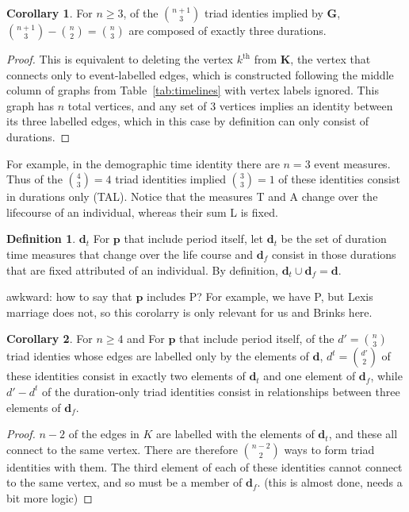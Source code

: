 \documentclass[12pt,oneside,a4paper]{article} %
\theoremstyle{definition}
\newtheorem{definition}{Definition}[section]
\newtheorem{corollary}{Corollary}[theorem]
\newcommand\vt[1]{\textcolor{rd}{#1}}
\begin{document}
\begin{appendices}
\begin{corollary}
For $n \ge 3$, of the $\binom{n+1}{3}$ triad identies implied by $\textbf{G}$,
$\binom{n+1}{3} - \binom{n}{2} = \binom{n}{3}$ are composed of exactly three
durations.
\end{corollary}

\begin{proof}
This is equivalent to deleting the vertex $k^{\text{th}}$ from $\textbf{K}$, the
vertex that connects only to event-labelled edges, which is constructed
following the middle column of graphs from Table~\ref{tab:timelines} with
vertex labels ignored. This graph has $n$ total vertices, and any set of 3
vertices implies an identity between its three labelled edges, which in this
case by definition can only consist of durations.
\end{proof}

For example, in the demographic time identity there are $n=3$ event measures.
Thus of the $\binom{4}{3} = 4$ triad identities implied $\binom{3}{3} = 1$ of
these identities consist in durations only (TAL). Notice that the measures T and
A change over the lifecourse of an individual, whereas their sum L is fixed.

\begin{definition}{$\textbf{d}_t$} For $\textbf{p}$ that include period
itself, let $\textbf{d}_t$ be the set of duration time measures that change over
the life course and $\textbf{d}_f$ consist in those durations that are fixed attributed of an individual. By
definition, $\textbf{d}_t \cup \textbf{d}_f = \textbf{d}$.
\end{definition}

\vt{awkward: how to say that $\textbf{p}$ includes P? For example, we have P,
but Lexis marriage does not, so this corolarry is only relevant for us and
Brinks here.}

\begin{corollary}
For $n \ge 4$ and For $\textbf{p}$ that include period
itself, of the $d'=\binom{n}{3}$ triad identies whose edges are
labelled only by the elements of $\textbf{d}$, $d^t=\binom{d'}{2}$ of these identities
consist in exactly two elements of $\textbf{d}_t$ and one element of
$\textbf{d}_f$, while $d'-d^t$ of the duration-only triad identities consist in
relationships between three elements of $\textbf{d}_f$.
\end{corollary}

\begin{proof}
$n-2$ of the edges in $K$ are labelled with the elements of $\textbf{d}_t$, and
these all connect to the same vertex. There are therefore $\binom{n-2}{2}$ ways
to form triad identities with them. The third element of each of these
identities cannot connect to the same vertex, and so must be a member of
$\textbf{d}_f$. \vt{(this is almost done, needs a bit more logic)}
\end{proof}




\end{appendices}
\end{document}
